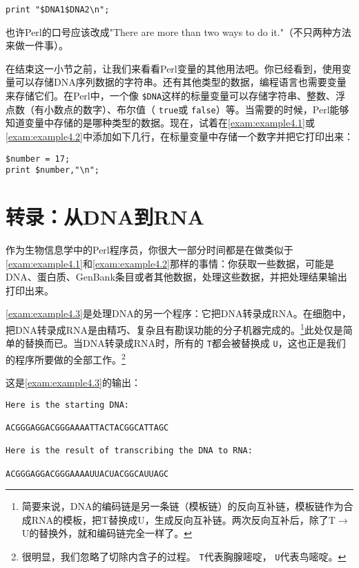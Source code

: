 \begin{lstlisting}
print "$DNA1$DNA2\n";
\end{lstlisting}

也许Perl的口号应该改成"There are more than two ways to do it."（不只两种方法来做一件事）。

在结束这一小节之前，让我们来看看Perl变量的其他用法吧。你已经看到，使用变量可以存储DNA序列数据的字符串。还有其他类型的数据，编程语言也需要变量来存储它们。在Perl中，一个像 \verb|$DNA|这样的标量变量可以存储字符串、整数、浮点数（有小数点的数字）、布尔值（ \verb|true|或 \verb|false|）等。当需要的时候，Perl能够知道变量中存储的是哪种类型的数据。现在，试着在\autoref{exam:example4.1}或\autoref{exam:example4.2}中添加如下几行，在标量变量中存储一个数字并把它打印出来：

\begin{lstlisting}
$number = 17;
print $number,"\n";
\end{lstlisting}

\section{转录：从DNA到RNA}
作为生物信息学中的Perl程序员，你很大一部分时间都是在做类似于\autoref{exam:example4.1}和\autoref{exam:example4.2}那样的事情：你获取一些数据，可能是DNA、蛋白质、GenBank条目或者其他数据，处理这些数据，并把处理结果输出打印出来。

\autoref{exam:example4.3}是处理DNA的另一个程序：它把DNA转录成RNA。在细胞中，把DNA转录成RNA是由精巧、复杂且有勘误功能的分子机器完成的。\footnote{简要来说，DNA的编码链是另一条链（模板链）的反向互补链，模板链作为合成RNA的模板，把T替换成U，生成反向互补链。两次反向互补后，除了T$\rightarrow$U的替换外，就和编码链完全一样了。}此处仅是简单的替换而已。当DNA转录成RNA时，所有的 \verb|T|都会被替换成 \verb|U|，这也正是我们的程序所要做的全部工作。\footnote{很明显，我们忽略了切除内含子的过程。 \verb|T|代表胸腺嘧啶， \verb|U|代表鸟嘧啶。}



这是\autoref{exam:example4.3}的输出：

\begin{lstlisting}
Here is the starting DNA:

ACGGGAGGACGGGAAAATTACTACGGCATTAGC

Here is the result of transcribing the DNA to RNA:

ACGGGAGGACGGGAAAAUUACUACGGCAUUAGC
\end{lstlisting}

